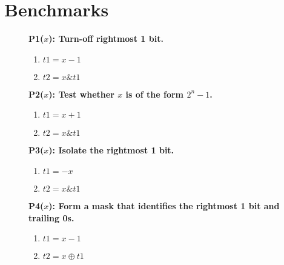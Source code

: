 {}


\appendix

\section{Benchmarks}
\label{app:benchmarks}

\begin{figure}
\scriptsize
 \begin{multicols}{4}
 
   \begin{minipage}{.2\textwidth}
   \bf{P1}($x$): Turn-off rightmost 1 bit.
   \begin{enumerate}
    \item $t1 = x - 1$
    \item $t2 = x \& t1$
   \end{enumerate}
   \end{minipage}

   \vspace{12pt}
   
   \begin{minipage}{.2\textwidth}
   \bf{P2}($x$): Test whether $x$ is of the form $2^n - 1$.
   \begin{enumerate}
    \item $t1 = x + 1$
    \item $t2 = x \& t1$
   \end{enumerate}
   \end{minipage}

   \vspace{12pt}
   

   \begin{minipage}{.2\textwidth}
   \bf{P3}($x$): Isolate the rightmost 1 bit.
   \begin{enumerate}
    \item $t1 = -x$
    \item $t2 = x \& t1$
   \end{enumerate}
   \end{minipage}

   \vspace{12pt}
   

   \begin{minipage}{.2\textwidth}
   \bf{P4}($x$): Form a mask that identifies the rightmost 1 bit and trailing 0s.
   \begin{enumerate}
    \item $t1 = x - 1$
    \item $t2 = x \oplus t1$
   \end{enumerate}
   \end{minipage}


\end{multicols}
\end{figure}
